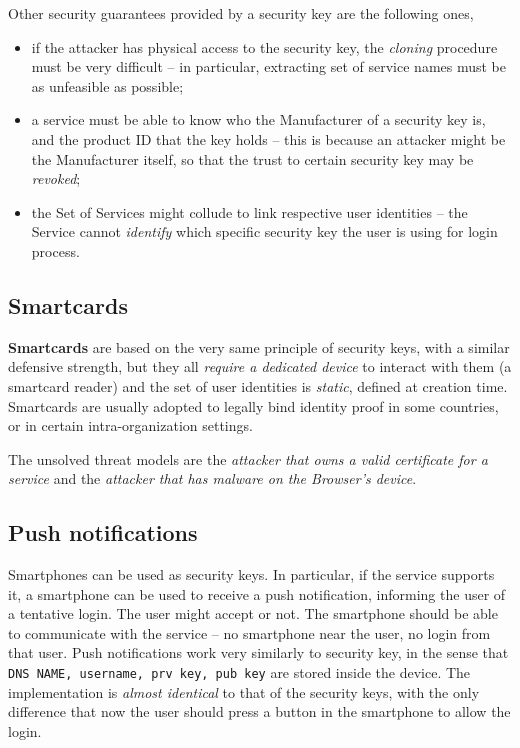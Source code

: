 \documentclass[10pt]{extbook}
\begin{document}
Other security guarantees provided by a security key are the following ones,
\begin{itemize}
    \item if the attacker has physical access to the security key, the
        \emph{cloning} procedure must be very difficult -- in particular,
        extracting set of service names must be as unfeasible as possible;
    \item a service must be able to know who the Manufacturer of a security key
        is, and the product ID that the key holds -- this is because an
        attacker might be the Manufacturer itself, so that the trust to certain
        security key may be \emph{revoked};
    \item the Set of Services might collude to link respective user identities
        -- the Service cannot \emph{identify} which specific security key the
        user is using for login process.
\end{itemize}

\subsection{Smartcards}

\textbf{Smartcards} are based on the very same principle of security keys, with
a similar defensive strength, but they all \emph{require a dedicated device} to
interact with them (a smartcard reader) and the set of user identities is
\emph{static}, defined at creation time. Smartcards are usually adopted to
legally bind identity proof in some countries, or in certain
intra\--organization settings.


The unsolved threat models are the \emph{attacker that owns a valid certificate
for a service} and the \emph{attacker that has malware on the Browser's
device}.

\subsection{Push notifications}

Smartphones can be used as security keys. In particular, if the service
supports it, a smartphone can be used to receive a push notification, informing
the user of a tentative login. The user might accept or not. The smartphone
should be able to communicate with the service -- no smartphone near the user,
no login from that user. Push notifications work very similarly to security
key, in the sense that \texttt{DNS NAME, username, prv key, pub key} are stored
inside the device. The implementation is \emph{almost identical} to that of the
security keys, with the only difference that now the user should press a button
in the smartphone to allow the login.
\end{document}
